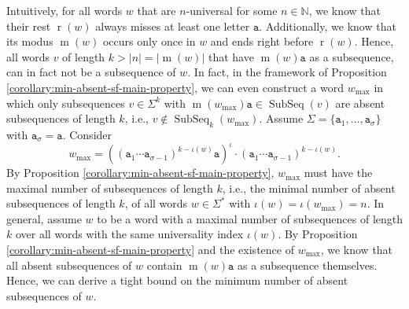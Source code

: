 \documentclass[runningheads,UKenglish,cleveref, autoref, thm-restate]{llncs}
\newcommand{\N}{\mathbb{N}}
\def\ta{\mathtt{a}}
\def\r{\operatorname{r}}
\def\m{\operatorname{m}}
\DeclareMathOperator\ScatFact{SubSeq}
\begin{document}
Intuitively, for all words $w$ that are $n$-universal for some $n\in\N$, we know that their rest $\r(w)$ always misses at least one letter $\ta$. Additionally, we know that its modus $\m(w)$ occurs only once in $w$ and ends right before $\r(w)$. Hence, all words $v$ of length $k > |n| = |\m(w)|$ that have $\m(w)\ta$ as a subsequence, can in fact not be a subsequence of $w$. In fact, in the framework of Proposition \ref{corollary:min-absent-sf-main-property}, we can even construct a word $w_{\max}$ in which only subsequences $v\in\Sigma^k$ with $\m(w_{\max})\ta\in\ScatFact(v)$ are absent subsequences of length $k$, i.e., $v\notin\ScatFact_k(w_{\max})$. Assume $\Sigma=\{\ta_1,\ldots,\ta_\sigma\}$ with $\ta_\sigma = \ta$. Consider 
$$ w_{\max}=((\ta_1 \cdots \ta_{\sigma-1})^{k-\iota(w)} \ta)^\iota \cdot (\ta_1 \cdots \ta_{\sigma-1})^{k-\iota(w)}.$$ 
By Proposition \ref{corollary:min-absent-sf-main-property}, $w_{\max}$ must have the maximal number of subsequences of length $k$, i.e., the minimal number of absent subsequences of length $k$, of all words $w\in\Sigma^*$ with $\iota(w) = \iota(w_{\max}) = n$.
In general, assume $w$ to be a word with a maximal number of subsequences of length $k$ over all words with the same universality index $\iota(w)$. By Proposition \ref{corollary:min-absent-sf-main-property} and the existence of $w_{\max}$, we know that all absent subsequences of $w$ contain $\m(w)\ta$ as a subsequence themselves. Hence, we can derive a tight bound on the minimum number of absent subsequences of $w$. %
\end{document}
